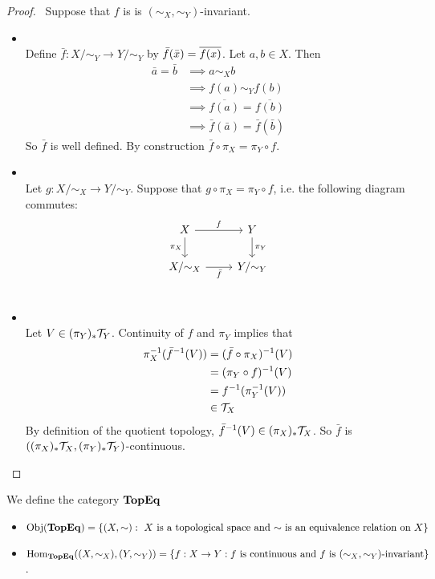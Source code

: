 \documentclass{book}
\begin{document}
	\begin{proof}\
	Suppose that $f$ is is $(\sim_X, \sim_Y)$-invariant. 
	\begin{itemize}
		\item {} \\
			Define $\bar{f}: X / {\sim_Y} \rightarrow Y/{\sim_Y}$ by $\bar{f}(\bar{x}) = \overline{f(x)}$. Let $a,b \in X$. Then 
		\begin{align*}
			\bar{a} = \bar{b}
			& \implies a \sim_X b \\
			& \implies f(a) \sim_Y f(b) \\
			& \implies \overline{f(a)} = \overline{f(b)} \\
			& \implies \bar{f}(\bar{a}) = \bar{f}(\bar{b}) 
		\end{align*}
		So $\bar{f}$ is well defined. By construction $\bar{f} \circ \pi_X = \pi_Y \circ f$.
		\item \tbf{Uniqueness:} \\
		Let $g: X / {\sim}_X \rightarrow Y/ {\sim_Y}$. Suppose that $g \circ \pi_X = \pi_Y \circ f$, i.e. the following diagram commutes:
		\[ 
		\begin{tikzcd}
			X  \arrow[r, "f"]  \arrow[d, "\pi_X"']  & Y   \arrow[d, "\pi_Y"]\\
			X/ {\sim_X} \arrow[r, "\bar{f}"'] &  Y / {\sim_Y} \\
		\end{tikzcd}
		\]
		\item  {} \\
		Let $V \in (\pi_Y)_* \mathcal{T}_Y$. Continuity of $f$ and $\pi_Y$ implies that 
		\begin{align*}
			\pi_X^{-1}(\bar{f}^{-1}(V))
			& = (\bar{f} \circ \pi_X)^{-1}(V) \\
			& = (\pi_Y \circ f)^{-1}(V) \\
			& = f^{-1}(\pi_Y^{-1}(V)) \\
			& \in \mathcal{T}_X
		\end{align*}
		By definition of the quotient topology, $\bar{f}^{-1}(V) \in (\pi_X)_*\mathcal{T}_X$. So $\bar{f}$ is $((\pi_X)_*\mathcal{T}_X, (\pi_Y)_*\mathcal{T}_Y)$-continuous.
	\end{itemize}
	\end{proof}

	\begin{defn} \ld{}
		We define the category $\operatorname*{\text{\textbf{TopEq}}}$ 
		\begin{itemize}
			\item $\operatorname{Obj}(\operatorname*{\text{\textbf{TopEq}}}) = \{(X, \sim):  \text{ $X$ is a topological space and $\sim$ is an equivalence relation on $X$}\}$
			\item $\operatorname{Hom}_{\operatorname*{\text{\textbf{TopEq}}}}((X, \sim_X), (Y, \sim_Y)) = \{f: X \rightarrow Y: \text{$f$ is continuous and $f$ is $(\sim_X, \sim_Y)$-invariant}\}$. 
		\end{itemize}
	\end{defn}
\end{document}
